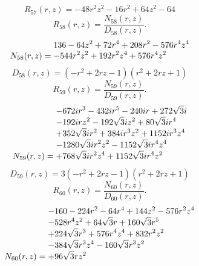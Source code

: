 \documentclass[11pt,a4paper]{article}
\begin{document}
\begin{equation}
R_{57}(r,z)=- 48 r^{2} z^{2} - 16 r^{2} + 64 z^{2} - 64
\label{eq:cat-rational-57}
\end{equation}
\begin{equation}
R_{58}(r,z)=\frac{N_{58}(r,z)}{D_{58}(r,z)}.
\label{eq:cat-rational-58}
\end{equation}
\begin{equation}
N_{58}(r,z)=\shortstack[l]{$\displaystyle 136 - 64 z^{2} + 72 r^{4} + 208 r^{2} - 576 r^{4} z^{4}$\\
$\displaystyle  - 544 r^{2} z^{2} + 192 r^{2} z^{4} + 576 r^{4} z^{2}$}
\label{eq:cat-numerator-58}
\end{equation}
\begin{equation}
D_{58}(r,z)=\left(- r^{2} + 2 r z - 1\right) \left(r^{2} + 2 r z + 1\right)
\label{eq:cat-denominator-58}
\end{equation}
\begin{equation}
R_{59}(r,z)=\frac{N_{59}(r,z)}{D_{59}(r,z)}.
\label{eq:cat-rational-59}
\end{equation}
\begin{equation}
N_{59}(r,z)=\shortstack[l]{$\displaystyle  - 672 i r^{3} - 432 i r^{5} - 240 i r + 272 \sqrt{3} i$\\
$\displaystyle  - 192 i r z^{2} - 192 \sqrt{3} i z^{2} + 80 \sqrt{3} i r^{4}$\\
$\displaystyle  + 352 \sqrt{3} i r^{2} + 384 i r^{3} z^{2} + 1152 i r^{3} z^{4}$\\
$\displaystyle  - 1280 \sqrt{3} i r^{2} z^{2} - 1152 \sqrt{3} i r^{4} z^{4}$\\
$\displaystyle  + 768 \sqrt{3} i r^{2} z^{4} + 1152 \sqrt{3} i r^{4} z^{2}$}
\label{eq:cat-numerator-59}
\end{equation}
\begin{equation}
D_{59}(r,z)=3 \left(- r^{2} + 2 r z - 1\right) \left(r^{2} + 2 r z + 1\right)
\label{eq:cat-denominator-59}
\end{equation}
\begin{equation}
R_{60}(r,z)=\frac{N_{60}(r,z)}{D_{60}(r,z)}.
\label{eq:cat-rational-60}
\end{equation}
\begin{equation}
N_{60}(r,z)=\shortstack[l]{$\displaystyle  - 160 - 224 r^{2} - 64 r^{4} + 144 z^{2} - 576 r^{2} z^{4}$\\
$\displaystyle  - 528 r^{4} z^{2} + 64 \sqrt{3} r + 160 \sqrt{3} r^{5}$\\
$\displaystyle  + 224 \sqrt{3} r^{3} + 576 r^{4} z^{4} + 832 r^{2} z^{2}$\\
$\displaystyle  - 384 \sqrt{3} r^{3} z^{4} - 160 \sqrt{3} r^{3} z^{2}$\\
$\displaystyle  + 96 \sqrt{3} r z^{2}$}
\label{eq:cat-numerator-60}
\end{equation}
\end{document}

